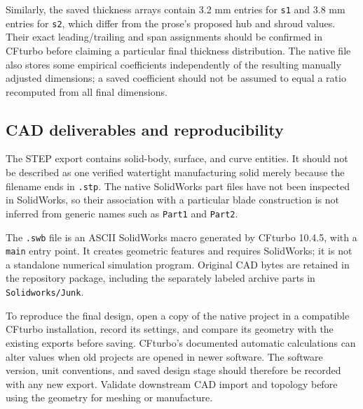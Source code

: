 \documentclass[11pt,a4paper]{article}
\begin{document}
Similarly, the saved thickness arrays contain 3.2 mm entries for \texttt{s1} and 3.8 mm entries for \texttt{s2}, which differ from the prose's proposed hub and shroud values. Their exact leading/trailing and span assignments should be confirmed in CFturbo before claiming a particular final thickness distribution. The native file also stores some empirical coefficients independently of the resulting manually adjusted dimensions; a saved coefficient should not be assumed to equal a ratio recomputed from all final dimensions.

\subsection{CAD deliverables and reproducibility}
The STEP export contains solid-body, surface, and curve entities. It should not be described as one verified watertight manufacturing solid merely because the filename ends in \texttt{.stp}. The native SolidWorks part files have not been inspected in SolidWorks, so their association with a particular blade construction is not inferred from generic names such as \texttt{Part1} and \texttt{Part2}.

The \texttt{.swb} file is an ASCII SolidWorks macro generated by CFturbo 10.4.5, with a \texttt{main} entry point. It creates geometric features and requires SolidWorks; it is not a standalone numerical simulation program. Original CAD bytes are retained in the repository package, including the separately labeled archive parts in \texttt{Solidworks/Junk}.

To reproduce the final design, open a copy of the native project in a compatible CFturbo installation, record its settings, and compare its geometry with the existing exports before saving. CFturbo's documented automatic calculations can alter values when old projects are opened in newer software. The software version, unit conventions, and saved design stage should therefore be recorded with any new export. Validate downstream CAD import and topology before using the geometry for meshing or manufacture.
\end{document}
